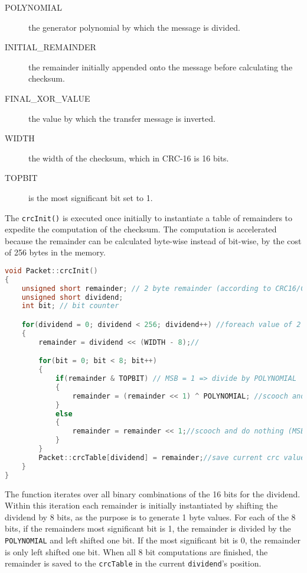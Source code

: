 \begin{description}
	\item[POLYNOMIAL] the generator polynomial by which the message is divided.
	\item[INITIAL\_REMAINDER] the remainder initially appended onto the message before calculating the checksum.
	\item[FINAL\_XOR\_VALUE] the value by which the transfer message is inverted.
	\item[WIDTH] the width of the checksum, which in CRC-16 is 16 bits.
	\item[TOPBIT] is the most significant bit set to 1.
\end{description}

The \texttt{crcInit()} is executed once initially to instantiate a table of remainders to expedite the computation of the checksum. The computation is accelerated because the remainder can be calculated byte-wise instead of bit-wise, by the cost of 256 bytes in the memory.  

\begin{lstlisting}[language=C, caption={Initializes CTC table.}]
void Packet::crcInit()
{
    unsigned short remainder; // 2 byte remainder (according to CRC16/CCITT standard)
    unsigned short dividend; 
    int bit; // bit counter

    for(dividend = 0; dividend < 256; dividend++) //foreach value of 2 bytes/8 bits
    {
        remainder = dividend << (WIDTH - 8);//

        for(bit = 0; bit < 8; bit++)
        {
            if(remainder & TOPBIT) // MSB = 1 => divide by POLYNOMIAL
            {
                remainder = (remainder << 1) ^ POLYNOMIAL; //scooch and divide
            }
            else
            {
		        remainder = remainder << 1;//scooch and do nothing (MSB = 0, move along)
	        }
        }
    	Packet::crcTable[dividend] = remainder;//save current crc value in crcTable
    }
}
\end{lstlisting}

The function iterates over all binary combinations of the 16 bits for the dividend. Within this iteration each remainder is initially instantiated by shifting the dividend by 8 bits, as the purpose is to generate 1 byte values. For each of the 8 bits, if the remainders most significant bit is 1, the remainder is divided by the \texttt{POLYNOMIAL} and left shifted one bit. If the most significant bit is 0, the remainder is only left shifted one bit. When all 8 bit computations are finished, the remainder is saved to the \texttt{crcTable} in the current \texttt{dividend}'s position.

